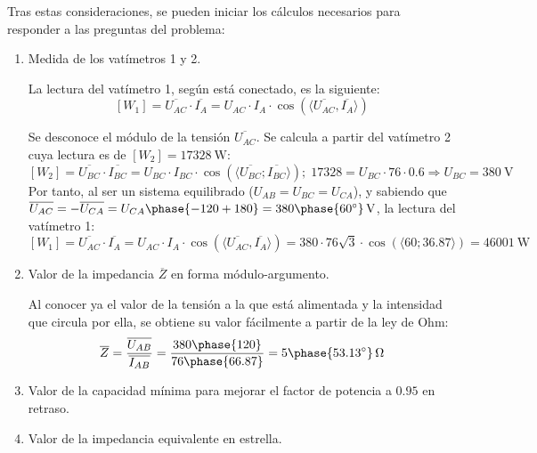 \documentclass[a4paper,11pt]{article}
\begin{document}
Tras estas consideraciones, se pueden iniciar los cálculos necesarios para responder a las preguntas del problema:
\begin{enumerate}
    \item 	Medida de los vatímetros 1 y 2.
    
La lectura del vatímetro 1, según está conectado, es la siguiente:
\[
[W_1]=\overline{U_{AC}}\cdot \overline{I _A}=U_{AC}\cdot I_A\cdot \cos(\langle \overline{U_{AC}}, \overline{I_A} \rangle)
\]

Se desconoce el módulo de la tensión $\overline{U_{AC}}$. Se calcula a partir del vatímetro 2 cuya lectura es de $[W_2]=\SI{17328}{\watt}$:
\[
[W_2]=\overline{U_{BC}}\cdot \overline{I_{BC}}=U_{BC}\cdot I_{BC}\cdot \cos(\langle \overline{U_{BC}}; \overline{I_{BC}}\rangle);\; 17328=U_{BC}\cdot 76\cdot 0.6\Rightarrow U_{BC}=\SI{380}{\volt}
\]
Por tanto, al ser un sistema equilibrado ($U_{AB}=U_{BC}=U_{CA}$), y sabiendo que $\overline{U_{AC}}=-\overline{U_{CA}}=U_{CA}\phase{-120+180}=\SI[parse-numbers=false]{380\phase{\SI{60}{\degree}}}{\volt}$, la lectura del vatímetro 1:
\[
[W_1]=\overline{U_{AC}}\cdot \overline{I_A}=U_{AC}\cdot I_A\cdot \cos(\langle \overline{U_{AC}}, \overline{I_A} \rangle)=380\cdot 76\sqrt{3}\cdot \cos(\langle60;36.87\rangle)=\SI{46001}{\watt}
\]

\item Valor de la impedancia $\overline{Z}$ en forma módulo-argumento.

Al conocer ya el valor de la tensión a la que está alimentada y la intensidad que circula por ella, se obtiene su valor fácilmente a partir de la ley de Ohm:
\[
\overline{Z}=\dfrac{\overline{U_{AB}}}{\overline{I_{AB}}}=\dfrac{380\phase{120}}{76\phase{66.87}}=\SI[parse-numbers=false]{5\phase{\SI{53.13}{\degree}}}{\ohm}
\]

\item Valor de la capacidad mínima para mejorar el factor de potencia a $0.95$ en retraso.




    \item Valor de la impedancia equivalente en estrella.


\end{enumerate}

\section{} 

\subsection{}



\newpage{}
\end{document}
